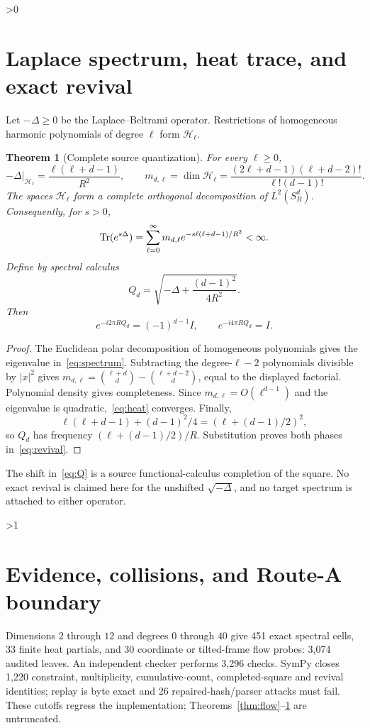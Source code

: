\documentclass[10pt]{article}
\providecommand{\CRevisionRound}{2}
\newtheorem{theorem}{Theorem}
\begin{document}
\ifnum\CRevisionRound>0
\section{Laplace spectrum, heat trace, and exact revival}
Let $-\Delta\ge0$ be the Laplace--Beltrami operator.  Restrictions of
homogeneous harmonic polynomials of degree $\ell$ form $\mathcal H_\ell$.
\begin{theorem}[Complete source quantization]\label{thm:spectrum}
For every $\ell\ge0$,
\begin{equation}\label{eq:spectrum}
 -\Delta|_{\mathcal H_\ell}=\frac{\ell(\ell+d-1)}{R^2},\qquad
 m_{d,\ell}=\dim\mathcal H_\ell
 =\frac{(2\ell+d-1)(\ell+d-2)!}{\ell!(d-1)!}.
\end{equation}
The spaces $\mathcal H_\ell$ form a complete orthogonal decomposition of
$L^2(S_R^d)$.  Consequently, for $s>0$,
\begin{equation}\label{eq:heat}
 \operatorname{Tr}(e^{s\Delta})=\sum_{\ell=0}^\infty
 m_{d,\ell}e^{-s\ell(\ell+d-1)/R^2}<\infty.
\end{equation}
Define by spectral calculus
\begin{equation}\label{eq:Q}
 Q_d=\sqrt{-\Delta+\frac{(d-1)^2}{4R^2}}.
\end{equation}
Then
\begin{equation}\label{eq:revival}
 e^{-i2\pi RQ_d}=(-1)^{d-1}I,\qquad e^{-i4\pi RQ_d}=I.
\end{equation}
\end{theorem}
\begin{proof}
The Euclidean polar decomposition of homogeneous polynomials gives the
eigenvalue in~\eqref{eq:spectrum}.  Subtracting the degree-$\ell-2$
polynomials divisible by $|x|^2$ gives
$m_{d,\ell}=\binom{\ell+d}{d}-\binom{\ell+d-2}{d}$, equal to the displayed
factorial.  Polynomial density gives completeness.  Since
$m_{d,\ell}=O(\ell^{d-1})$ and the eigenvalue is quadratic,~\eqref{eq:heat}
converges.  Finally,
\[
 \ell(\ell+d-1)+(d-1)^2/4=(\ell+(d-1)/2)^2,
\]
so $Q_d$ has frequency $(\ell+(d-1)/2)/R$.  Substitution proves both phases
in~\eqref{eq:revival}.
\end{proof}

The shift in~\eqref{eq:Q} is a source functional-calculus completion of the
square.  No exact revival is claimed here for the unshifted
$\sqrt{-\Delta}$, and no target spectrum is attached to either operator.
\fi

\ifnum\CRevisionRound>1
\section{Evidence, collisions, and Route-A boundary}
Dimensions $2$ through $12$ and degrees $0$ through $40$ give 451 exact
spectral cells, 33 finite heat partials, and 30 coordinate or tilted-frame
flow probes: 3,074 audited leaves.  An independent checker performs 3,296
checks.  SymPy closes 1,220 constraint, multiplicity, cumulative-count,
completed-square and revival identities; replay is byte exact and 26
repaired-hash/parser attacks must fail.  These cutoffs regress the
implementation; Theorems~\ref{thm:flow}--\ref{thm:spectrum} are untruncated.
\end{document}
